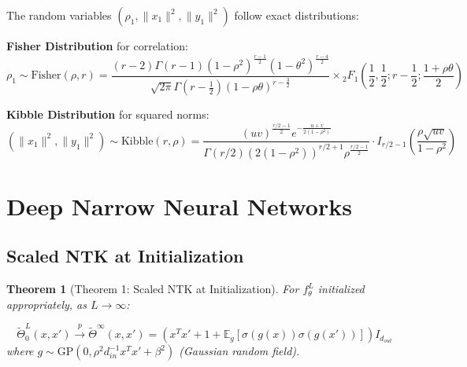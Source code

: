 \documentclass[a4paper]{article}
\newcommand{\E}{\mathbb{E}}
\newcommand{\E}{\mathbb{E}}
\theoremstyle{plain}
\newtheorem{theorem}{Theorem}[section]
\theoremstyle{definition}
\theoremstyle{remark}
\begin{document}
\begin{tcolorbox}[colback=blue!15,colframe=blue!50!black,title={\textbf{Exact Probability Laws}},enhanced,drop shadow]
The random variables $(\rho_1, \|x_1\|^2, \|y_1\|^2)$ follow exact distributions:

\textbf{Fisher Distribution} for correlation:
\begin{equation}
\boxed{\rho_1 \sim \text{Fisher}(\rho, r) = \frac{(r-2)\Gamma(r-1)(1-\rho^2)^{\frac{r-1}{2}}(1-\theta^2)^{\frac{r-4}{2}}}{\sqrt{2\pi}\Gamma(r-\frac{1}{2})(1-\rho \theta)^{r-\frac{3}{2}}} \times {}_2F_1\left(\frac{1}{2}, \frac{1}{2}; r-\frac{1}{2}; \frac{1+\rho \theta}{2}\right)}
\end{equation}

\textbf{Kibble Distribution} for squared norms:
\begin{equation}
\boxed{(\|x_1\|^2, \|y_1\|^2) \sim \text{Kibble}(r, \rho) = \frac{(uv)^{\frac{r/2-1}{2}} e^{-\frac{u+v}{2(1-\rho^2)}}}{\Gamma(r/2) (2(1-\rho^2))^{r/2+1} \rho^{\frac{r/2-1}{2}}} \cdot I_{r/2-1}\left(\frac{\rho\sqrt{uv}}{1-\rho^2}\right)}
\end{equation}
\end{tcolorbox}



\newpage


\section{Deep Narrow Neural Networks}

\subsection{Scaled NTK at Initialization}

\begin{theorem}[Theorem 1: Scaled NTK at Initialization]
For $f^L_\theta$ initialized appropriately, as $L \to \infty$:

\begin{tcolorbox}[colback=blue!10,colframe=blue!80!black,title={\textbf{Deep Narrow NTK Limit}},enhanced,drop shadow,boxrule=2pt]
\begin{equation}
\boxed{\tilde{\Theta}^L_0(x, x') \xrightarrow{p} \tilde{\Theta}^\infty(x, x') = (x^T x' + 1 + \E_g[\sigma(g(x))\sigma(g(x'))]) I_{d_{out}}}
\end{equation}
where $g \sim \text{GP}(0, \rho^2 d_{in}^{-1} x^T x' + \beta^2)$ (Gaussian random field).
\end{tcolorbox}
\end{theorem}
\end{document}
